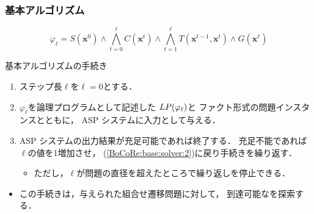 \documentclass[dvipdfmx,11pt]{beamer}
\begin{document}
\begin{frame}
  \frametitle{基本アルゴリズム}

  \[
    \varphi_{\ell} = S(\bm{x}^0)  
    \land \bigwedge_{t=0}^{\ell} C(\bm{x}^t) 
    \land \bigwedge_{t=1}^{\ell} T(\bm{x}^{t-1},\bm{x}^{t}) 
    \land G(\bm{x}^\ell)  
  \]

\begin{block}{基本アルゴリズムの手続き}
\begin{enumerate}
\item ステップ長$\ell$を$\ell=0$とする．
\item \label{BoCoRe:base:solver:2}
  $\varphi_\ell$を論理プログラムとして記述した
  $LP(\varphi_\ell)$と
  ファクト形式の問題インスタンスとともに，
  ASP システムに入力として与える．
\item ASP システムの出力結果が充足可能であれば終了する．
  充足不能であれば$\ell$の値を1増加させ，
  (\ref{BoCoRe:base:solver:2})に戻り手続きを繰り返す．
  \begin{itemize}
  \item ただし，$\ell$が問題の直径を超えたところで繰り返しを停止できる．
  \end{itemize}
\end{enumerate}
\end{block}

\begin{itemize}
\item この手続きは，与えられた組合せ遷移問題に対して，
 到達可能なを探索する．
\end{itemize}
\end{frame}
\end{document}
